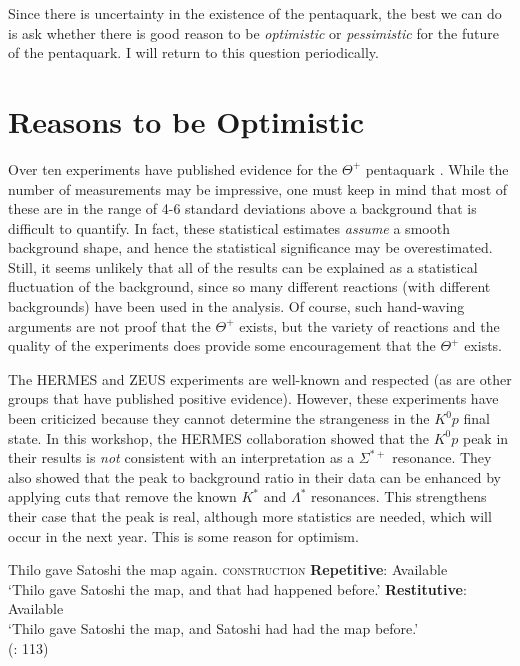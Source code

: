 \documentclass{ws-procs9x6}
\newcommand{\thp}{$\Theta^+$ }
\begin{document}
Since there is uncertainty in the existence 
of the pentaquark, the best we can do is ask whether there 
is good reason to be {\it optimistic} or {\it pessimistic} 
for the future of the pentaquark.  I will return to this 
question periodically.


\section{ Reasons to be Optimistic }

Over ten experiments have published evidence for the \thp pentaquark 
\cite{leps,diana,clas-d,clas-p,saphir,itep,hermes,zeus,na49,cosy,svd}.
While the number of measurements may be impressive, one must keep in 
mind that most of these are in the range of 4-6 standard deviations 
above a background that is difficult to quantify.  In fact, these 
statistical estimates {\it assume} a smooth background shape, and 
hence the statistical significance may be overestimated. Still, 
it seems unlikely that all of the results can be explained as a 
statistical fluctuation of the background, since so many different 
reactions (with different backgrounds) have been used in the analysis. 
Of course, such hand-waving arguments are not proof that the 
\thp exists, but the variety of reactions and the quality of 
the experiments does provide some encouragement that the \thp 
exists.

The HERMES and ZEUS experiments are well-known and respected (as 
are other groups that have published positive evidence).  However, 
these experiments have been criticized \cite{meson04} because they 
cannot determine the strangeness in the $K^0p$ final state.  In 
this workshop, the HERMES collaboration \cite{lorenzon} showed 
that the $K^0p$ peak in their results is {\it not} consistent with 
an interpretation as a $\Sigma^{*+}$ resonance.  They also showed 
that the peak to background ratio in their data can be enhanced by 
applying cuts that remove the known $K^*$ and $\Lambda^*$ resonances.
This strengthens their case that the peak is real, although more 
statistics are needed, which will occur in the next year. 
This is some reason for optimism.



 \ea\label{ex:bondarenko:3}{Thilo gave Satoshi the map again.}\hfill\textsc{ construction}
\ea \textbf{Repetitive}: Available\\`Thilo gave Satoshi the map, and that had happened before.'
\ex \textbf{Restitutive}: Available\\`Thilo gave Satoshi the map, and Satoshi had had the map before.'\\
\hfill(\citealt{Beck-Johnson2004}: 113)
\z
\z
\end{document}
